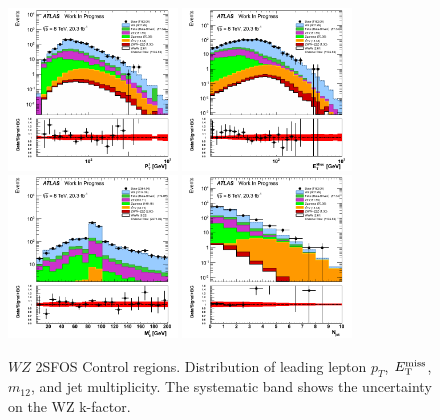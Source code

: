 \begin{figure}[htp]
\centering
\includegraphics[width=0.4\textwidth]{figures/WZ_CR/LeadingLeptonPt_histratio.png}
\includegraphics[width=0.4\textwidth]{figures/WZ_CR/MET_Et_histratio.png}
\includegraphics[width=0.4\textwidth]{figures/WZ_CR/InvariantMassSFOS_histratio.png}
\includegraphics[width=0.4\textwidth]{figures/WZ_CR/NJets_histratio.png}
\caption{$WZ$ 2SFOS Control regions. Distribution of leading lepton $p_{T}$, $E_{\mathrm{T}}^{\mathrm{miss}}$, $m_{12}$, and jet multiplicity. The systematic band shows the uncertainty on the WZ k-factor.}
\label{fig:WZ_2SFOS_CR}
\end{figure}  


